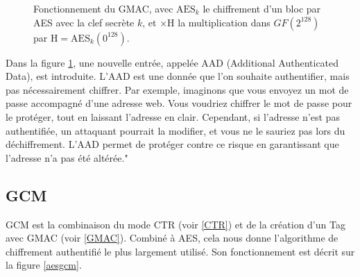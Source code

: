 \documentclass[a4paper, 12pt]{article}
\begin{document}
\begin{figure}[h]
\caption{Fonctionnement du GMAC, avec $\text{AES}_k$ le chiffrement d'un bloc par AES avec la clef secrète $k$, et $\times \text{H}$ la multiplication dans $GF\left(2^{128}\right)$ par $\text{H} = \text{AES}_k\left({0}^{128}\right)$.}
\label{gmac}
\end{figure}

Dans la figure \ref{gmac}, une nouvelle entrée, appelée AAD (Additional Authenticated Data), est introduite. L'AAD est une donnée que l'on souhaite authentifier, mais pas nécessairement chiffrer. Par exemple, imaginons que vous envoyez un mot de passe accompagné d'une adresse web. Vous voudriez chiffrer le mot de passe pour le protéger, tout en laissant l'adresse en clair. Cependant, si l'adresse n'est pas authentifiée, un attaquant pourrait la modifier, et vous ne le sauriez pas lors du déchiffrement. L'AAD permet de protéger contre ce risque en garantissant que l'adresse n'a pas été altérée."

\subsection{GCM}

GCM est la combinaison du mode CTR (voir \ref{CTR}) et de la création d'un Tag avec GMAC (voir \ref{GMAC}). Combiné à AES, cela nous donne l'algorithme de chiffrement authentifié le plus largement utilisé. Son fonctionnement est décrit sur la figure \ref{aesgcm}.
\end{document}
